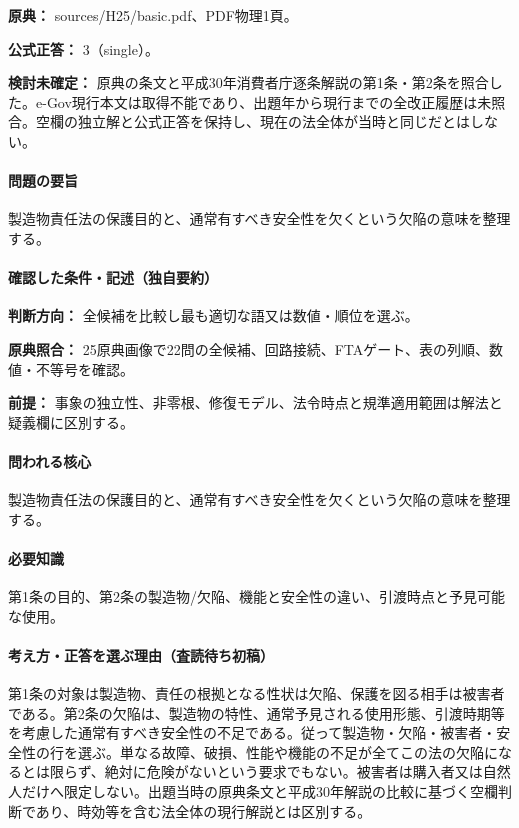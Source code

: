 \noindent\textbf{原典：} sources/H25/basic.pdf、PDF物理1頁。

\textbf{公式正答：} 3（single）。

\par\textbf{検討未確定：} 原典の条文と平成30年消費者庁逐条解説の第1条・第2条を照合した。e-Gov現行本文は取得不能であり、出題年から現行までの全改正履歴は未照合。空欄の独立解と公式正答を保持し、現在の法全体が当時と同じだとはしない。

\paragraph{問題の要旨} 製造物責任法の保護目的と、通常有すべき安全性を欠くという欠陥の意味を整理する。

\paragraph{確認した条件・記述（独自要約）}\mbox{}\par

\noindent\textbf{判断方向：} 全候補を比較し最も適切な語又は数値・順位を選ぶ。\par

\noindent\textbf{原典照合：} 25原典画像で22問の全候補、回路接続、FTAゲート、表の列順、数値・不等号を確認。\par

\noindent\textbf{前提：} 事象の独立性、非零根、修復モデル、法令時点と規準適用範囲は解法と疑義欄に区別する。\par

\paragraph{問われる核心} 製造物責任法の保護目的と、通常有すべき安全性を欠くという欠陥の意味を整理する。

\paragraph{必要知識} 第1条の目的、第2条の製造物/欠陥、機能と安全性の違い、引渡時点と予見可能な使用。

\paragraph{考え方・正答を選ぶ理由（査読待ち初稿）} 第1条の対象は製造物、責任の根拠となる性状は欠陥、保護を図る相手は被害者である。第2条の欠陥は、製造物の特性、通常予見される使用形態、引渡時期等を考慮した通常有すべき安全性の不足である。従って製造物・欠陥・被害者・安全性の行を選ぶ。単なる故障、破損、性能や機能の不足が全てこの法の欠陥になるとは限らず、絶対に危険がないという要求でもない。被害者は購入者又は自然人だけへ限定しない。出題当時の原典条文と平成30年解説の比較に基づく空欄判断であり、時効等を含む法全体の現行解説とは区別する。

